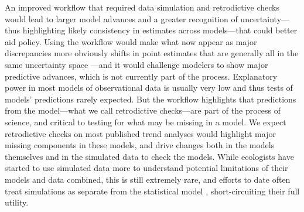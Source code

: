 \documentclass[11pt]{article}
\begin{document}
An improved workflow that required data simulation and retrodictive checks would lead to larger model advances and a greater recognition of uncertainty---thus highlighting likely consistency in estimates across models---that could better aid policy.  Using the workflow would make what now appear as major discrepancies more obviously shifts in point estimates that are generally all in the same uncertainty space \citep{Johnson2024}---and it would challenge modelers to show major predictive advances, which is not currently part of the process. Explanatory power in most models of observational data is usually very low \citep{low2014rising,moller2002much} and thus tests of models' predictions rarely expected. But the workflow highlights that predictions from the model---what we call retrodictive checks---are part of the process of science, and critical to testing for what may be missing in a model. We expect retrodictive checks on most published trend analyses would highlight major missing components in these models, and drive changes both in the models themselves and in the simulated data to check the models. While ecologists have started to use simulated data more to understand potential limitations of their models and data combined, this is still extremely rare, and efforts to date often treat simulations as separate from the statistical model \citep{Buschke2021,dove2023quantifying}, short-circuiting their full utility.

\end{document}
